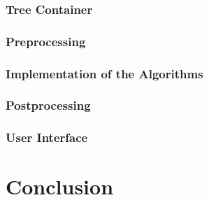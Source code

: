 \documentclass[10pt,twoside,a4paper]{report}
\begin{document}
\subsection{Tree Container}
\subsection{Preprocessing}
\subsection{Implementation of the Algorithms}
\subsection{Postprocessing}
\subsection{User Interface}

\chapter{Conclusion}
\end{document}
